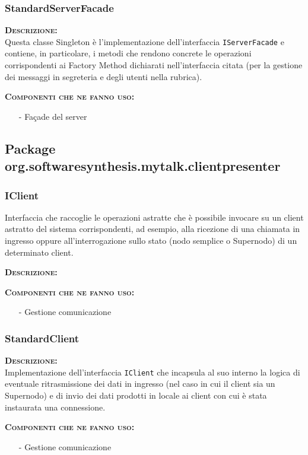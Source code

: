 \subsubsection{StandardServerFacade}
\begin{description}
	\item{\scshape\bfseries Descrizione:}\\
Questa classe Singleton è l'implementazione dell'interfaccia \texttt{IServerFacade} e contiene, in particolare, i metodi che rendono concrete le operazioni corrispondenti ai Factory Method dichiarati nell'interfaccia citata (per la gestione dei messaggi in segreteria e degli utenti nella rubrica).
	\item{\scshape\bfseries Componenti che ne fanno uso:}
	\begin{itemize}[noitemsep,nolistsep]
	  \item[-] Façade del server
	\end{itemize}
\end{description}

\subsection{Package org.softwaresynthesis.mytalk.clientpresenter}
\subsubsection{IClient}
Interfaccia che raccoglie le operazioni astratte che è possibile invocare su un client astratto del sistema corrispondenti, ad esempio, alla ricezione di una chiamata in ingresso oppure all'interrogazione sullo stato (nodo semplice o Supernodo) di un determinato client.
\begin{description}
	\item{\scshape\bfseries Descrizione:}\\
	\item{\scshape\bfseries Componenti che ne fanno uso:}
	\begin{itemize}[noitemsep,nolistsep]
	  \item[-] Gestione comunicazione
	\end{itemize}
\end{description}

\subsubsection{StandardClient}
\begin{description}
	\item{\scshape\bfseries Descrizione:}\\
Implementazione dell'interfaccia \texttt{IClient} che incapsula al suo interno la logica di eventuale ritrasmissione dei dati in ingresso (nel caso in cui il client sia un Supernodo) e di invio dei dati prodotti in locale ai client con cui è stata instaurata una connessione. 
	\item{\scshape\bfseries Componenti che ne fanno uso:}
	\begin{itemize}[noitemsep,nolistsep]
	  \item[-] Gestione comunicazione
	\end{itemize}
\end{description}

